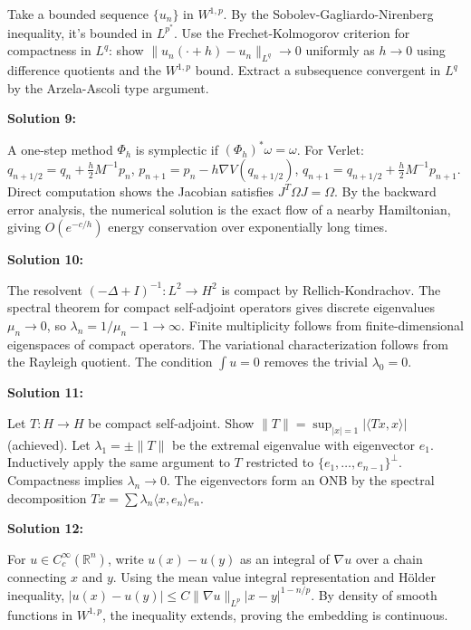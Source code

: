 \documentclass[12pt,a4paper]{exam}
\begin{document}
Take a bounded sequence $\{u_n\}$ in $W^{1,p}$. By the Sobolev-Gagliardo-Nirenberg inequality, it's bounded in $L^{p^*}$. Use the Frechet-Kolmogorov criterion for compactness in $L^q$: show $\|u_n(\cdot + h) - u_n\|_{L^q} \to 0$ uniformly as $h \to 0$ using difference quotients and the $W^{1,p}$ bound. Extract a subsequence convergent in $L^q$ by the Arzela-Ascoli type argument.

\vspace{0.5cm}

\textbf{Solution 9:}

A one-step method $\Phi_h$ is symplectic if $(\Phi_h)^*\omega = \omega$. For Verlet: $q_{n+1/2} = q_n + \frac{h}{2} M^{-1} p_n$, $p_{n+1} = p_n - h \nabla V(q_{n+1/2})$, $q_{n+1} = q_{n+1/2} + \frac{h}{2} M^{-1} p_{n+1}$. Direct computation shows the Jacobian satisfies $J^T \Omega J = \Omega$. By the backward error analysis, the numerical solution is the exact flow of a nearby Hamiltonian, giving $O(e^{-c/h})$ energy conservation over exponentially long times.

\vspace{0.5cm}

\textbf{Solution 10:}

The resolvent $(-\Delta + I)^{-1}: L^2 \to H^2$ is compact by Rellich-Kondrachov. The spectral theorem for compact self-adjoint operators gives discrete eigenvalues $\mu_n \to 0$, so $\lambda_n = 1/\mu_n - 1 \to \infty$. Finite multiplicity follows from finite-dimensional eigenspaces of compact operators. The variational characterization follows from the Rayleigh quotient. The condition $\int u = 0$ removes the trivial $\lambda_0 = 0$.

\vspace{0.5cm}

\textbf{Solution 11:}

Let $T: H \to H$ be compact self-adjoint. Show $\|T\| = \sup_{|x|=1} |\langle Tx, x \rangle|$ (achieved). Let $\lambda_1 = \pm\|T\|$ be the extremal eigenvalue with eigenvector $e_1$. Inductively apply the same argument to $T$ restricted to $\{e_1,\ldots,e_{n-1}\}^\perp$. Compactness implies $\lambda_n \to 0$. The eigenvectors form an ONB by the spectral decomposition $Tx = \sum \lambda_n \langle x, e_n \rangle e_n$.

\vspace{0.5cm}

\textbf{Solution 12:}

For $u \in C_c^\infty(\mathbb{R}^n)$, write $u(x) - u(y)$ as an integral of $\nabla u$ over a chain connecting $x$ and $y$. Using the mean value integral representation and H\"older inequality, $|u(x) - u(y)| \leq C \|\nabla u\|_{L^p} |x-y|^{1-n/p}$. By density of smooth functions in $W^{1,p}$, the inequality extends, proving the embedding is continuous.
\end{document}
